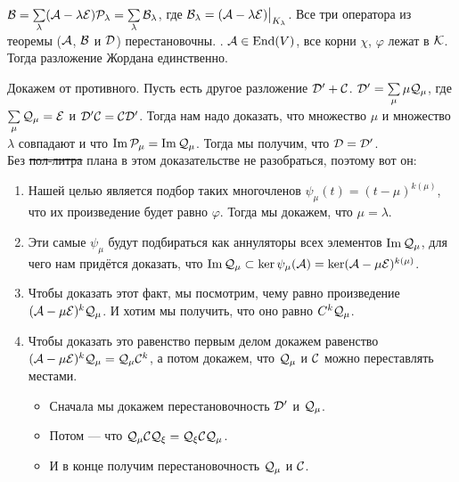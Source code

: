 \documentclass{article}
\DeclareMathOperator{\operIm}{Im}
\let\Im\operIm
\newcommand*{\id}{{\scriptE}}
\begin{document}
\begin{itemize}
\begin{Proof}
        \end{Proof}
        \thm $\scriptB=\sum\limits_{\lambda}(\scriptA-\lambda\id)\scriptP_\lambda=\sum\limits_{\lambda}\scriptB_\lambda$, где $\scriptB_\lambda=(\scriptA-\lambda\id)\big|_{K_\lambda}$.
        \thm Все три оператора из теоремы (${\mathcal{A}}$, ${\mathcal{B}}$ и ${\mathcal{D}}$) перестановочны.
        \thm {}. ${\mathcal{A}}\in\operatorname{End}(V)$, все корни $\chi$, $\varphi$ лежат в ${\mathcal{K}}$. Тогда разложение Жордана единственно.
        \begin{Proof}
            Докажем от противного. Пусть есть другое разложение ${\mathcal{D}}'+{\mathcal{C}}$. ${\mathcal{D}}'=\sum\limits_{\mu}\mu{\mathcal{Q}}_\mu$, где $\sum\limits_{\mu}\scriptQ_\mu=\id$ и ${\mathcal{D}}'{\mathcal{C}}={\mathcal{C}}{\mathcal{D}}'$. Тогда нам надо доказать, что множество $\mu$ и множество $\lambda$ совпадают и что $\Im\scriptP_\mu=\Im\scriptQ_\mu$. Тогда мы получим, что ${\mathcal{D}}={\mathcal{D}}'$.\\
            Без \sout{пол-литра} плана в этом доказательстве не разобраться, поэтому вот он:
            \begin{enumerate}
                \item Нашей целью является подбор таких многочленов $\psi_\mu(t)=(t-\mu)^{k(\mu)}$, что их произведение будет равно $\varphi$. Тогда мы докажем, что $\mu=\lambda$.
                \item Эти самые $\psi_\mu$ будут подбираться как аннуляторы всех элементов $\Im\scriptQ_\mu$, для чего нам придётся доказать, что $\Im\scriptQ_\mu\subset\ker\psi_\mu(\scriptA)=\ker(\scriptA-\mu\id)^{k(\mu)}$.
                \item Чтобы доказать этот факт, мы посмотрим, чему равно произведение $(\scriptA-\mu\id)^k\scriptQ_\mu$. И хотим мы получить, что оно равно $C^k{\mathcal{Q}}_\mu$.
                \item Чтобы доказать это равенство первым делом докажем равенство $(\scriptA-\mu\id)^k\scriptQ_\mu=\scriptQ_\mu\scriptC^k$, а потом докажем, что ${\mathcal{Q}}_\mu$ и ${\mathcal{C}}$ можно переставлять местами.
                \begin{itemize}
                    \item Сначала мы докажем перестановочность ${\mathcal{D}}'$ и ${\mathcal{Q}}_\mu$.
                    \item Потом --- что ${\mathcal{Q}}_\mu{\mathcal{C}}{\mathcal{Q}}_\xi={\mathcal{Q}}_\xi{\mathcal{C}}{\mathcal{Q}}_\mu$.
                    \item И в конце получим перестановочность ${\mathcal{Q}}_\mu$ и ${\mathcal{C}}$.

\end{itemize}
\end{enumerate}
\end{Proof}
\end{itemize}
\end{document}
